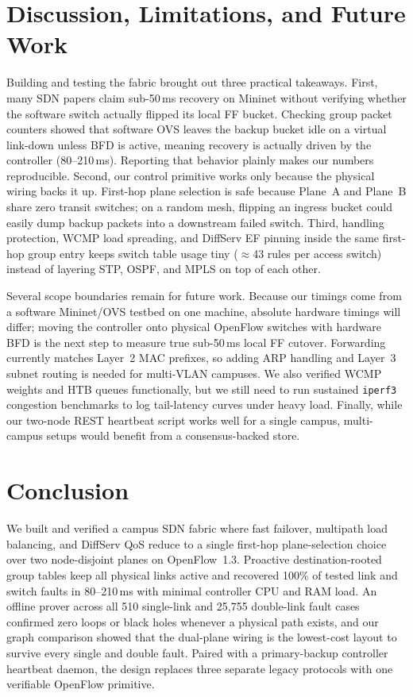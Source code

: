 \documentclass[conference]{IEEEtran}
\begin{document}
\section{Discussion, Limitations, and Future Work}\label{sec:discuss}
Building and testing the fabric brought out three practical takeaways. First, many SDN papers claim sub-50\,ms recovery on Mininet without verifying whether the software switch actually flipped its local FF bucket. Checking group packet counters showed that software OVS leaves the backup bucket idle on a virtual link-down unless BFD is active, meaning recovery is actually driven by the controller (80--210\,ms). Reporting that behavior plainly makes our numbers reproducible. Second, our control primitive works only because the physical wiring backs it up. First-hop plane selection is safe because Plane~A and Plane~B share zero transit switches; on a random mesh, flipping an ingress bucket could easily dump backup packets into a downstream failed switch. Third, handling protection, WCMP load spreading, and DiffServ EF pinning inside the same first-hop group entry keeps switch table usage tiny ($\approx$43 rules per access switch) instead of layering STP, OSPF, and MPLS on top of each other.

Several scope boundaries remain for future work. Because our timings come from a software Mininet/OVS testbed on one machine, absolute hardware timings will differ; moving the controller onto physical OpenFlow switches with hardware BFD is the next step to measure true sub-50\,ms local FF cutover. Forwarding currently matches Layer~2 MAC prefixes, so adding ARP handling and Layer~3 subnet routing is needed for multi-VLAN campuses. We also verified WCMP weights and HTB queues functionally, but we still need to run sustained \texttt{iperf3} congestion benchmarks to log tail-latency curves under heavy load. Finally, while our two-node REST heartbeat script works well for a single campus, multi-campus setups would benefit from a consensus-backed store.

\section{Conclusion}\label{sec:conclusion}
We built and verified a campus SDN fabric where fast failover, multipath load balancing, and DiffServ QoS reduce to a single first-hop plane-selection choice over two node-disjoint planes on OpenFlow~1.3. Proactive destination-rooted group tables keep all physical links active and recovered 100\% of tested link and switch faults in 80--210\,ms with minimal controller CPU and RAM load. An offline prover across all 510 single-link and 25{,}755 double-link fault cases confirmed zero loops or black holes whenever a physical path exists, and our graph comparison showed that the dual-plane wiring is the lowest-cost layout to survive every single and double fault. Paired with a primary-backup controller heartbeat daemon, the design replaces three separate legacy protocols with one verifiable OpenFlow primitive.
\end{document}
